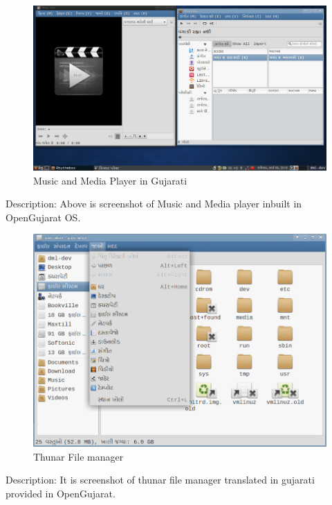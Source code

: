 \newpage
\begin{figure}[h]
\begin{center}
  \includegraphics[scale=0.35] {12.png}
  \caption[Screenshot - Music and Media player in OpenGujarat]{Music and Media Player in Gujarati}
\end{center}
\end{figure}
Description:  Above is screenshot of Music and Media player inbuilt in OpenGujarat OS.

\newpage

\begin{figure}[h]
\begin{center}
  \includegraphics[scale=0.4] {13.png}
 \caption[Screenshot - Thunar File manager]{Thunar File manager}
\end{center}
\end{figure}
Description: It is screenshot of thunar file manager translated in gujarati provided in OpenGujarat.

